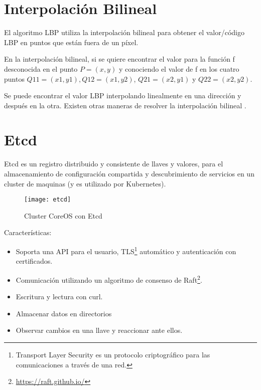 \pagebreak
\chapter{Interpolación Bilineal}
El algoritmo LBP utiliza la interpolación bilineal para obtener el valor/código LBP en puntos que están fuera de un píxel. 

En la interpolación bilineal, si se quiere encontrar el valor para la función f desconocida en el punto \(P = (x, y)\) y conociendo el valor de f en los cuatro puntos \(Q11 = (x1, y1), Q12 = (x1, y2)\), \(Q21 = (x2, y1)\) y \(Q22 = (x2, y2)\).

Se puede encontrar el valor LBP interpolando linealmente en una dirección y después en la otra. Existen otras maneras de resolver la interpolación bilineal \cite{Banerjee2014-xj}.

\pagebreak
\chapter{Etcd}
Etcd \cite{CoreOS2016-cp} es un registro distribuido y consistente de llaves  y valores, para el almacenamiento de configuración compartida y descubrimiento de servicios en un cluster de maquinas (y es utilizado por Kubernetes).
    \begin{figure}[H]
        \centering
        \texttt{[image: etcd]}
        \caption{Cluster CoreOS con Etcd \protect\cite{CoreOS2016-zr}}
        \label{fig:coreos2016-etcd}
    \end{figure}
    \pagebreak
Características:
\begin{itemize}
\item Soporta una API para el usuario, TLS\footnote{Transport Layer Security es un protocolo criptográfico para las comunicaciones a través de una red.} automático y autenticación con certificados.
\item Comunicación utilizando un algoritmo de consenso de Raft\footnote{\url{https://raft.github.io/}}.
\item Escritura y lectura con curl.
\item Almacenar datos en directorios
\item Observar cambios en una llave y reaccionar ante ellos.


\end{itemize}

